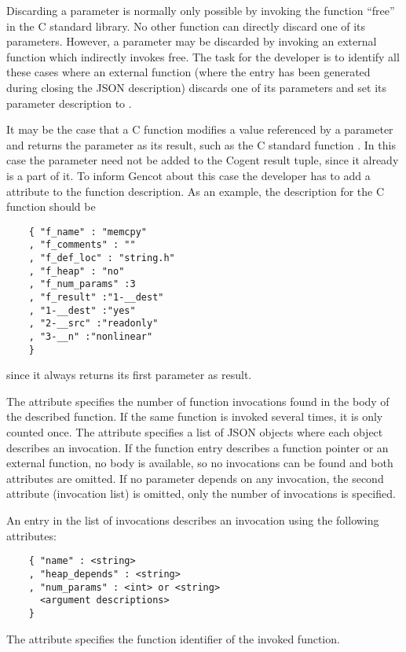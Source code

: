 Discarding a parameter is normally only possible by invoking the function ``free'' in the C standard library. No other function
can directly discard one of its parameters. However, a parameter may be discarded by invoking an external function which indirectly
invokes free. The task for the developer is to identify all these cases where an external function (where the entry has been
generated during closing the JSON description) discards one of its parameters and set its parameter description to .

It may be the case that a C function modifies a value referenced by a parameter and returns the parameter as its result, such as 
the C standard function . In this case the parameter need not be added to the Cogent result tuple, since it already
is a part of it. To inform Gencot about this case the developer has to add a  attribute to the function
description. As an example, the description for the C function  should be
\begin{verbatim}
    { "f_name" : "memcpy"
    , "f_comments" : ""
    , "f_def_loc" : "string.h"
    , "f_heap" : "no"
    , "f_num_params" :3
    , "f_result" :"1-__dest"
    , "1-__dest" :"yes" 
    , "2-__src" :"readonly" 
    , "3-__n" :"nonlinear" 
    }
\end{verbatim}
since it always returns its first parameter as result.

The attribute  specifies the number of function invocations found in the body of the described function.
If the same function is invoked several times, it is only counted once. The attribute  specifies a list
of JSON objects where each object describes an invocation. If the function entry describes a function pointer or an external
function, no body is available, so no invocations can be found and both attributes are omitted. If no parameter depends on
any invocation, the second attribute (invocation list) is omitted, only the number of invocations is specified.

An entry in the list of invocations describes an invocation using the following attributes:
\begin{verbatim}
    { "name" : <string> 
    , "heap_depends" : <string>
    , "num_params" : <int> or <string>
      <argument descriptions>
    }
\end{verbatim}

The attribute  specifies the function identifier of the invoked function. 

